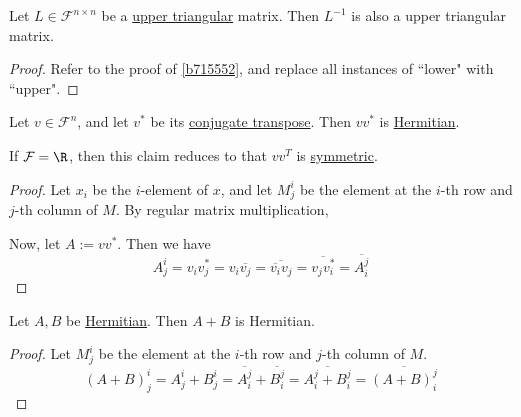 \label{a8f4ca9}

Let $L\in\mathcal F^{n\times n}$ be a \href{c39b6bf}{upper triangular} matrix.
Then $L^{-1}$ is also a upper triangular matrix.

\begin{proof}
  Refer to the proof of \autoref{b715552}, and replace all instances of ``lower"
  with ``upper".
\end{proof}

\label{dd38b0c}

Let $v\in\mathcal F^n$, and let $v^*$ be its \href{abdc1e4}{conjugate
transpose}. Then $vv^*$ is \href{a633178}{Hermitian}.

If $\mathcal F=\R$, then this claim reduces to that $vv^T$ is
\href{adcfa41}{symmetric}.

\begin{proof}
  Let $x_i$ be the $i$-element of $x$, and let $M^i_j$ be the element at the
  $i$-th row and $j$-th column of $M$. By regular matrix multiplication,

  Now, let $A:=vv^*$. Then we have
  \begin{equation*}
    A^i_j
    =v_iv^*_j
    =v_i\overline{v_j}
    =\overline{\overline{v_i}v_j}
    =\overline{v_jv^*_i}
    =\overline{A^j_i}
  \end{equation*}
\end{proof}

\label{a2ea95a}

Let $A,B$ be \href{a633178}{Hermitian}. Then $A+B$ is Hermitian.

\begin{proof}
  Let $M^i_j$ be the element at the $i$-th row and $j$-th column of $M$.
  \begin{equation*}
    (A+B)^i_j=A^i_j+B^i_j
    =\overline{A^j_i}+\overline{B^j_i}
    =\overline{A^j_i+B^j_i}
    =\overline{(A+B)^j_i}
  \end{equation*}
\end{proof}
